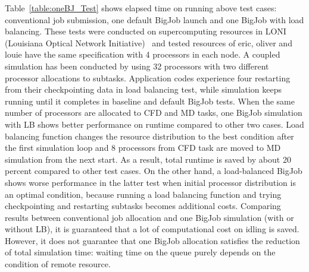\documentclass[conference,final]{IEEEtran}
\begin{document}
Table~\ref{table:oneBJ_Test} shows elapsed time on running above test cases: conventional job submission, one default BigJob launch and one BigJob with load balancing. These tests were conducted on supercomputing resources in LONI (Louisiana Optical Network Initiative)~\cite{LONI_web} and tested resources of eric, oliver and louie have the same specification with 4 processors in each node. A coupled simulation has been conducted by using 32 processors with two different processor allocations to subtasks. Application codes experience four restarting from their checkpointing data in load balancing test, while simulation keeps running until it completes in baseline and default BigJob tests.
When the same number of processors are allocated to CFD and MD tasks, one BigJob simulation with LB shows better performance on runtime compared to other two cases. Load balancing function changes the resource distribution to the best condition after the first simulation loop and 8 processors from CFD task are moved to MD simulation from the next start. As a result, total runtime is saved by about 20 percent compared to other test cases. On the other hand, a load-balanced BigJob shows worse performance in the latter test when initial processor distribution is an optimal condition, because running a load balancing function and trying checkpointing and restarting subtasks becomes additional costs. Comparing results between conventional job allocation and one BigJob simulation (with or without LB), it is guaranteed that a lot of computational cost on idling is saved. However, it does not guarantee that one BigJob allocation satisfies the reduction of total simulation time: waiting time on the queue purely depends on the condition of remote resource.


\end{document}
